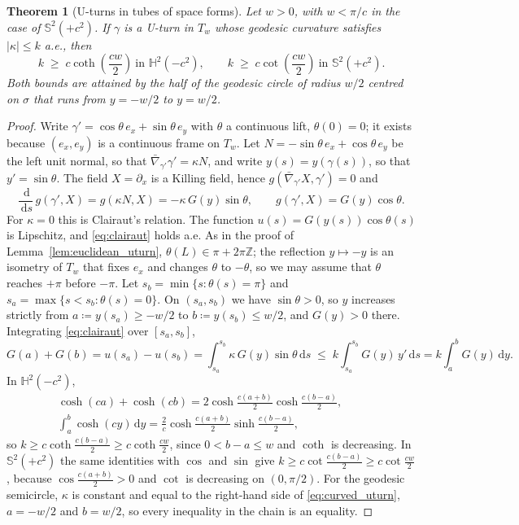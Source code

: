 \documentclass[11pt,reqno]{amsart}
\newtheorem{theorem}{Theorem}[section]
\theoremstyle{definition}
\providecommand{\Hyp}{\mathbb{H}}
\providecommand{\Sph}{\mathbb{S}}
\providecommand{\dif}{\,\mathrm{d}}
\numberwithin{equation}{section}
\providecommand{\Hyp}{\mathbb{H}}
\providecommand{\Sph}{\mathbb{S}}
\begin{document}
\begin{theorem}[U-turns in tubes of space forms]
\label{prop:space_form_uturn}
Let $w > 0$, with $w < \pi/c$ in the case of $\Sph^2(+c^2)$. If $\gamma$ is a U-turn in $T_w$ whose geodesic curvature satisfies $|\kappa| \le k$ a.e., then
\begin{equation}
\label{eq:curved_uturn}
k \;\ge\; c \coth\left(\frac{c w}{2}\right) \ \text{in } \Hyp^2(-c^2), \qquad k \;\ge\; c \cot\left(\frac{c w}{2}\right) \ \text{in } \Sph^2(+c^2).
\end{equation}
Both bounds are attained by the half of the geodesic circle of radius $w/2$ centred on $\sigma$ that runs from $y = -w/2$ to $y = w/2$.
\end{theorem}
\begin{proof}
Write $\gamma' = \cos\theta\, e_x + \sin\theta\, e_y$ with $\theta$ a continuous lift, $\theta(0) = 0$; it exists because $(e_x, e_y)$ is a continuous frame on $T_w$. Let $N = -\sin\theta\, e_x + \cos\theta\, e_y$ be the left unit normal, so that $\bar\nabla_{\gamma'}\gamma' = \kappa N$, and write $y(s) = y(\gamma(s))$, so that $y' = \sin\theta$. The field $X = \partial_x$ is a Killing field, hence $g(\bar\nabla_{\gamma'}X, \gamma') = 0$ and
\begin{equation}
\label{eq:clairaut}
\frac{\dif}{\dif s}\, g(\gamma', X) = g(\kappa N, X) = -\kappa\, G(y) \sin\theta, \qquad g(\gamma', X) = G(y)\cos\theta .
\end{equation}
For $\kappa = 0$ this is Clairaut's relation. The function $u(s) = G(y(s))\cos\theta(s)$ is Lipschitz, and \eqref{eq:clairaut} holds a.e. As in the proof of Lemma~\ref{lem:euclidean_uturn}, $\theta(L) \in \pi + 2\pi\mathbb{Z}$; the reflection $y \mapsto -y$ is an isometry of $T_w$ that fixes $e_x$ and changes $\theta$ to $-\theta$, so we may assume that $\theta$ reaches $+\pi$ before $-\pi$. Let $s_b = \min\{s : \theta(s) = \pi\}$ and $s_a = \max\{s < s_b : \theta(s) = 0\}$. On $(s_a, s_b)$ we have $\sin\theta > 0$, so $y$ increases strictly from $a \coloneqq y(s_a) \ge -w/2$ to $b \coloneqq y(s_b) \le w/2$, and $G(y) > 0$ there. Integrating \eqref{eq:clairaut} over $[s_a, s_b]$,
\[
G(a) + G(b) = u(s_a) - u(s_b) = \int_{s_a}^{s_b} \kappa\, G(y) \sin\theta \dif s \;\le\; k \int_{s_a}^{s_b} G(y)\, y' \dif s = k \int_a^b G(y) \dif y .
\]
In $\Hyp^2(-c^2)$,
\begin{multline*}
\cosh(ca) + \cosh(cb) = 2\cosh\tfrac{c(a+b)}{2}\cosh\tfrac{c(b-a)}{2}, \qquad \\
\int_a^b \cosh(cy)\dif y = \tfrac{2}{c}\cosh\tfrac{c(a+b)}{2}\sinh\tfrac{c(b-a)}{2},
\end{multline*}
so $k \ge c\coth\frac{c(b-a)}{2} \ge c\coth\frac{cw}{2}$, since $0 < b - a \le w$ and $\coth$ is decreasing. In $\Sph^2(+c^2)$ the same identities with $\cos$ and $\sin$ give $k \ge c\cot\frac{c(b-a)}{2} \ge c\cot\frac{cw}{2}$, because $\cos\frac{c(a+b)}{2} > 0$ and $\cot$ is decreasing on $(0, \pi/2)$. For the geodesic semicircle, $\kappa$ is constant and equal to the right-hand side of \eqref{eq:curved_uturn}, $a = -w/2$ and $b = w/2$, so every inequality in the chain is an equality.
\end{proof}
\end{document}
